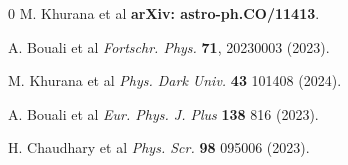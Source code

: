 \documentclass[aps,prd,showpacs,nofootinbib,floats,floatfix,preprintnumbers,groupedaddress,twocolumn]{revtex4-1}
\begin{document}
\begin{thebibliography}{0}
 M. Khurana et al \textbf{arXiv: astro-ph.CO/11413}.

 A. Bouali et al \textit{Fortschr. Phys.} \textbf{71}, 20230003 (2023).

 M. Khurana et al \textit{Phys. Dark Univ.} \textbf{43} 101408 (2024).

 A. Bouali et al \textit{Eur. Phys. J. Plus} \textbf{138} 816 (2023).

 H. Chaudhary et al \textit{Phys. Scr.} \textbf{98} 095006 (2023).


\end{thebibliography}
\end{document}
